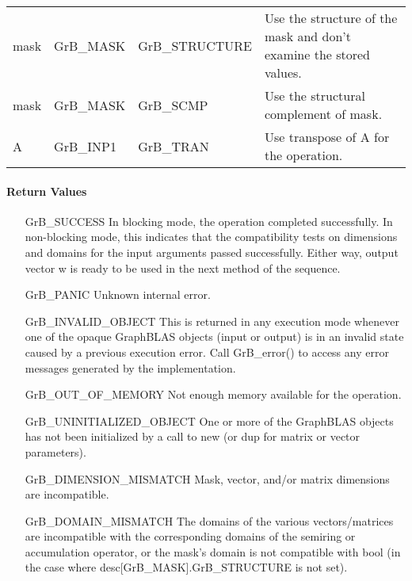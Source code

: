 \begin{itemize}[leftmargin=1.1in]
\begin{tabular}{lllp{2.7in}}
        {\sf mask} & {\sf GrB\_MASK} & {\sf GrB\_STRUCTURE}   & Use the structure
        of the {\sf mask} and don't examine the stored values.\\

        {\sf mask} & {\sf GrB\_MASK} & {\sf GrB\_SCMP}   & Use the structural
        complement of {\sf mask}. \\

        {\sf A}    & {\sf GrB\_INP1} & {\sf GrB\_TRAN}   & Use transpose of {\sf A}
        for the operation. \\
    \end{tabular}
\end{itemize}

\paragraph{Return Values}

\begin{itemize}[leftmargin=2.1in]
    \item[{\sf GrB\_SUCCESS}]         In blocking mode, the operation completed
    successfully. In non-blocking mode, this indicates that the compatibility 
    tests on dimensions and domains for the input arguments passed successfully. 
    Either way, output vector {\sf w} is ready to be used in the next method of 
    the sequence.

    \item[{\sf GrB\_PANIC}]           Unknown internal error.

    \item[{\sf GrB\_INVALID\_OBJECT}] This is returned in any execution mode 
    whenever one of the opaque GraphBLAS objects (input or output) is in an invalid 
    state caused by a previous execution error.  Call {\sf GrB\_error()} to access 
    any error messages generated by the implementation.

    \item[{\sf GrB\_OUT\_OF\_MEMORY}] Not enough memory available for the operation.

    \item[{\sf GrB\_UNINITIALIZED\_OBJECT}] One or more of the GraphBLAS objects 
    has not been initialized by a call to {\sf new} (or {\sf dup} for matrix or
    vector parameters).

    \item[{\sf GrB\_DIMENSION\_MISMATCH}] Mask, vector, and/or matrix 
    dimensions are incompatible.

    \item[{\sf GrB\_DOMAIN\_MISMATCH}]    The domains of the various vectors/matrices are
    incompatible with the corresponding domains of the semiring or
    accumulation operator, or the mask's domain is not compatible with {\sf bool}
    (in the case where {\sf desc[GrB\_MASK].GrB\_STRUCTURE} is not set).
\end{itemize}

